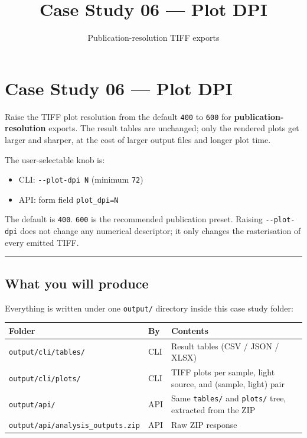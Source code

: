 \documentclass[
  11pt,
]{article}
\title{Case Study 06 — Plot DPI}
\subtitle{Publication-resolution TIFF exports}
\author{}
\date{}
\providecommand{\tightlist}{
  \setlength{\itemsep}{0pt}\setlength{\parskip}{0pt}}
\begin{document}
\maketitle

{
\hypersetup{linkcolor=}
\setcounter{tocdepth}{2}
\tableofcontents
}
\hypertarget{case-study-06--plot-dpi}{
\section{Case Study 06 --- Plot DPI}\label{case-study-06--plot-dpi}}

Raise the TIFF plot resolution from the default \texttt{400} to
\texttt{600} for \textbf{publication-resolution} exports. The result
tables are unchanged; only the rendered plots get larger and sharper, at
the cost of larger output files and longer plot time.

The user-selectable knob is:

\begin{itemize}
\tightlist
\item
  CLI: \texttt{-\/-plot-dpi\ N} (minimum \texttt{72})
\item
  API: form field \texttt{plot\_dpi=N}
\end{itemize}

The default is \texttt{400}. \texttt{600} is the recommended publication
preset. Raising \texttt{-\/-plot-dpi} does not change any numerical
descriptor; it only changes the rasterisation of every emitted TIFF.

\begin{center}\rule{0.5\linewidth}{0.5pt}\end{center}

\hypertarget{what-you-will-produce}{
\subsection{What you will produce}\label{what-you-will-produce}}

Everything is written under one \texttt{output/} directory inside this
case study folder:

\begin{longtable}[]{@{}lll@{}}
\toprule
Folder & By & Contents \\
\midrule
\endhead
\texttt{output/cli/tables/} & CLI & Result tables (CSV / JSON / XLSX) \\
\texttt{output/cli/plots/} & CLI & TIFF plots per sample, light source,
and (sample, light) pair \\
\texttt{output/api/} & API & Same \texttt{tables/} and \texttt{plots/}
tree, extracted from the ZIP \\
\texttt{output/api/analysis\_outputs.zip} & API & Raw ZIP response \\
\bottomrule
\end{longtable}
\end{document}
